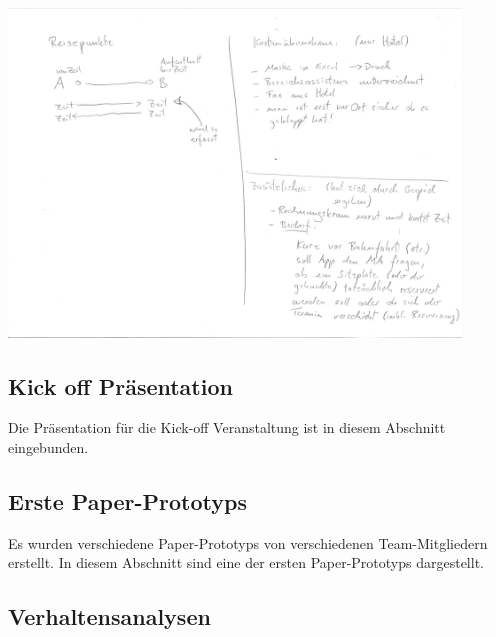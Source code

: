 \documentclass[12pt,a4paper]{article}
\begin{document}
\begin{center}
\includegraphics[width=12cm]{04_softwareloesung02_003.jpg}\\
\end{center}

\newpage
\vspace*{40mm}
\subsection{Kick off Pr\"asentation}

Die Pr\"asentation f\"ur die Kick-off Veranstaltung ist in diesem Abschnitt eingebunden.



\newpage
\vspace*{40mm}
\subsection{Erste Paper-Prototyps}

Es wurden verschiedene Paper-Prototyps von verschiedenen Team-Mitgliedern erstellt. In diesem Abschnitt sind eine der ersten Paper-Prototyps dargestellt.









\newpage
\vspace*{40mm}
\subsection{Verhaltensanalysen}
\end{document}
